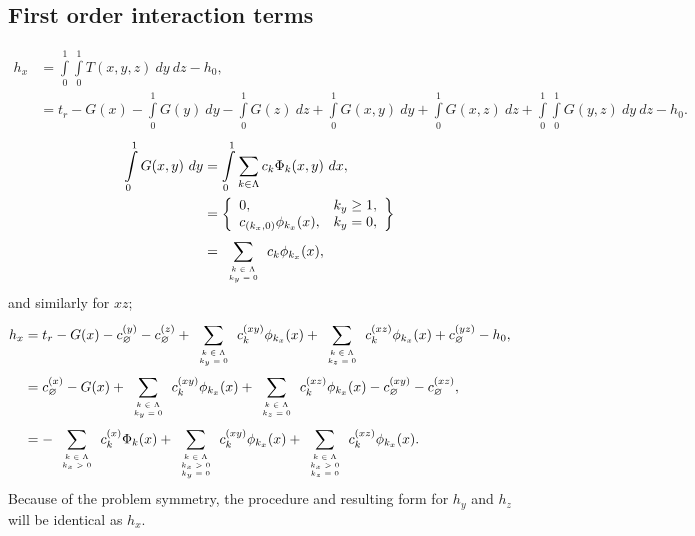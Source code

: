 \documentclass[11pt]{article}
\newcommand{\intz}{\ensuremath{\int\limits_0^1}}
\newcommand{\mlsum}[2]{\ensuremath{\sum_{\tiny\begin{array}{c}#1\end{array}}^{#2}}}
\begin{document}
\subsection{First order interaction terms}
\begin{align}
  h_x &= \intz\intz T(x,y,z)\ dy\ dz - h_0, \\
  &= t_r - G(x) - \intz G(y)\ dy - \intz G(z)\ dz + \intz G(x,y)\ dy + \intz G(x,z)\ dz + \intz\intz G(y,z)\
  dy\ dz - h_0.
\end{align}
\begin{align}
  \intz G(x,y)\ dy &= \intz \sum_{k\in\Lambda} c_k\Phi_k(x,y)\ dx, \\
    &= \left\{\begin{array}{lr}
          0, & k_y \geq 1,\\
          c_{(k_x,0)}\phi_{k_x}(x), & k_y = 0,
       \end{array} \right\} \\
      &= \mlsum{k\in\Lambda\\k_y=0}{} c_k\phi_{k_x}(x),
\end{align}
and similarly for $xz$;
\begin{align}
  h_x &= t_r - G(x) - c^{(y)}_\varnothing - c^{(z)}_\varnothing + \mlsum{k\in\Lambda\\k_y=0}{} c^{(xy)}_k\phi_{k_x}(x) +
  \mlsum{k\in\Lambda\\k_z=0}{} c^{(xz)}_k\phi_{k_x}(x) + c^{(yz)}_\varnothing - h_0,\\
  &= c^{(x)}_\varnothing - G(x) + \mlsum{k\in\Lambda\\k_y=0}{} c^{(xy)}_k\phi_{k_x}(x) +
  \mlsum{k\in\Lambda\\k_z=0}{} c^{(xz)}_k\phi_{k_x}(x) - c^{(xy)}_\varnothing -
        c^{(xz)}_\varnothing, \\
  &= -\mlsum{k\in\Lambda\\k_x>0}{} c^{(x)}_k\Phi_k(x) + \mlsum{k\in\Lambda\\k_x>0\\k_y=0}{} c^{(xy)}_k\phi_{k_x}(x) +
  \mlsum{k\in\Lambda\\k_x>0\\k_z=0}{} c^{(xz)}_k\phi_{k_x}(x).
\end{align}
Because of the problem symmetry, the procedure and resulting form for $h_y$ and $h_z$ will be identical as $h_x$.
\end{document}
